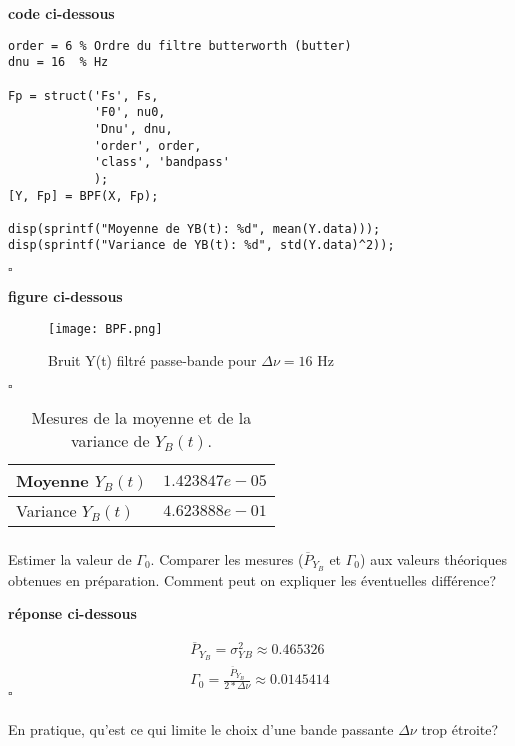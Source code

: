 \documentclass{article}
\newcommand{\dnu}{16}
\newcommand{\debutrep}[1]{\color{blue}\begin{center} \hrulefill \textbf{ #1 } \hrulefill \end{center} }
\newcommand{\finrep}{\vspace*{5mm}\hfill $\square$\color{black}\vspace*{5mm}}
\begin{document}
\debutrep{code ci-dessous}
\begin{verbatim}
order = 6 % Ordre du filtre butterworth (butter)
dnu = 16  % Hz

Fp = struct('Fs', Fs,
            'F0', nu0,
            'Dnu', dnu,
            'order', order,
            'class', 'bandpass'
            );
[Y, Fp] = BPF(X, Fp);

disp(sprintf("Moyenne de YB(t): %d", mean(Y.data)));
disp(sprintf("Variance de YB(t): %d", std(Y.data)^2));
\end{verbatim}
\finrep

\debutrep{figure ci-dessous}
\begin{figure}[H]
\centering
\texttt{[image: BPF.png]}
 \caption{Bruit Y(t) filtré passe-bande pour $\Delta\nu = \dnu$ Hz}
 \label{fig-Y}
\end{figure}
\finrep

\begin{table}[H]
\begin{center}
\begin{tabular}{| L{40mm} | C{40mm}|}\hline
Moyenne $Y_{B}(t)$ 	
& $1.423847e-05$
\\[5mm] \hline
Variance $Y_{B}(t)$ 	
& $4.623888e-01$
\\[5mm] \hline
\end{tabular}
\end{center}
\caption{Mesures de la moyenne et de la variance de $Y_{B}(t)$.}
\label{table-YB}
\end{table}

\subsubsection{}

Estimer la valeur de $\Gamma_0$. Comparer les mesures ($\overline{P}_{Y_B}$ et $\Gamma_0$) aux valeurs théoriques obtenues en préparation. Comment peut on expliquer les éventuelles différence?

\debutrep{réponse ci-dessous}
    \begin{gather}
        \nonumber \overline{P}_Y_B = \sigma^2_Y_B \approx 0.465326 \\
        \nonumber \Gamma_0 = \frac{\overline{P}_Y_B}{2*\Delta\nu} \approx 0.0145414
    \end{gather}
\finrep

\subsubsection{}
En pratique, qu'est ce qui limite le choix d'une  bande passante $\Delta \nu$ trop étroite?
\end{document}

